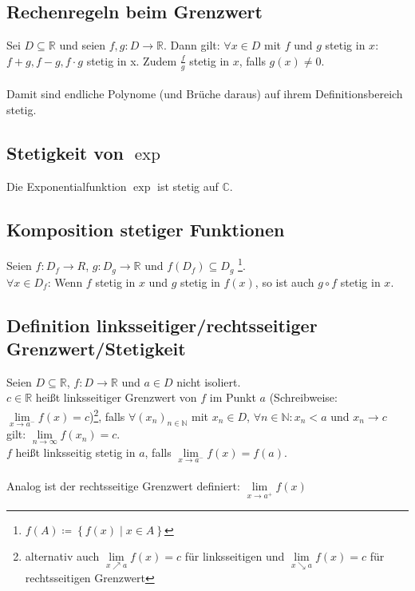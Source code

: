 \documentclass[halfparscip]{scrartcl}
\newcounter{subsection2}
\begin{document}
\subsection{Rechenregeln beim Grenzwert}
Sei $D \subseteq \mathbb{R}$ und seien $f, g: D \rightarrow \mathbb{R}$. Dann gilt:
$\forall x \in D$ mit $f$ und $g$ stetig in $x$: $f + g, f-g, f\cdot g$ stetig in x. Zudem $\frac{f}{g}$ stetig in $x$, falls $g(x) \neq 0$.\\\\
Damit sind endliche Polynome (und Brüche daraus) auf ihrem Definitionsbereich stetig.

\subsection{Stetigkeit von $\exp$}
Die Exponentialfunktion $\exp$ ist stetig auf $\mathbb{C}$.

\subsection{Komposition stetiger Funktionen}
Seien $f: D_f \rightarrow R$, $g : D_g \rightarrow \mathbb{R}$ und $f(D_f) \subseteq D_g$ \footnote{$f(A) \coloneqq \left\{f(x) \;\vert\; x \in A\right\}$}.\\
$\forall x \in D_f$: Wenn $f$ stetig in $x$ und $g$ stetig in $f(x)$, so ist auch $g \circ f$ stetig in $x$.

\subsection{Definition linksseitiger/rechtsseitiger Grenzwert/Stetigkeit}
Seien $D \subseteq \mathbb{R}$, $f : D \rightarrow \mathbb{R}$ und $a \in D$ nicht isoliert.\\
$c \in \mathbb{R}$ heißt linksseitiger Grenzwert von $f$ im Punkt $a$ (Schreibweise: $\lim\limits_{x \rightarrow a^-} f(x) = c$)\footnote{alternativ auch $\lim\limits_{x \nearrow a} f(x) = c$ für linksseitigen und $\lim\limits_{x \searrow a} f(x) = c$ für rechtsseitigen Grenzwert}, falls $\forall (x_n)_{n \in \mathbb{N}}$ mit $x_n \in D$, $\forall n \in \mathbb{N}: x_n < a$ und $x_n \rightarrow c$ gilt: $\lim\limits_{n \rightarrow \infty} f(x_n) = c$.\\
$f$ heißt linksseitig stetig in $a$, falls $\lim\limits_{x \rightarrow a^-} f(x) = f(a)$.\\\\
Analog ist der rechtsseitige Grenzwert definiert: $\lim\limits_{x \rightarrow a^+} f(x)$
\end{document}
